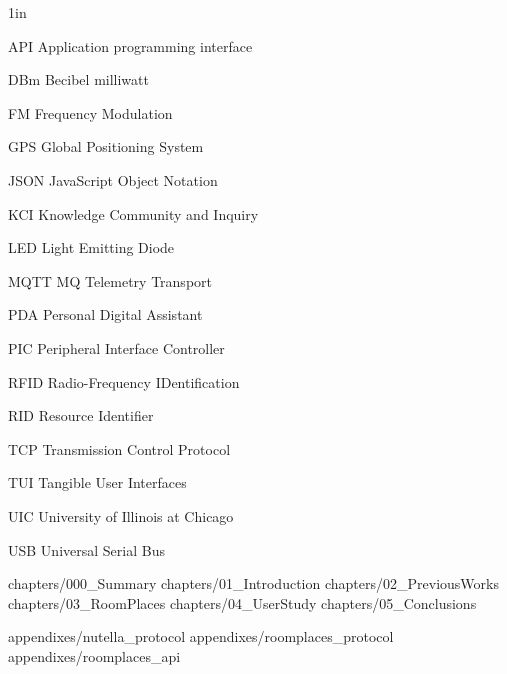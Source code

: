 \documentclass{uicthesi}
\begin{document}
\tableofcontents
\listoftables
\listoffigures
\listofabbreviations
\begin{list}
{}
{\setlength
   {}{1in}
    \setlength{\leftmargin}{1.5in}
    \setlength{\labelsep}{.5in}
    \setlength{\rightmargin}{\leftmargin}}
\item[API\hfill] Application programming interface
\item[DBm\hfill] Becibel milliwatt
\item[FM\hfill] Frequency Modulation
\item[GPS\hfill] Global Positioning System
\item[JSON\hfill] JavaScript Object Notation
\item[KCI\hfill] Knowledge  Community  and  Inquiry
\item[LED\hfill] Light Emitting Diode
\item[MQTT\hfill] MQ Telemetry Transport
\item[PDA\hfill] Personal Digital Assistant
\item[PIC\hfill] Peripheral Interface Controller
\item[RFID\hfill] Radio-Frequency IDentification
\item[RID\hfill] Resource Identifier
\item[TCP\hfill] Transmission Control Protocol
\item[TUI\hfill] Tangible User Interfaces
\item[UIC\hfill] University of Illinois at Chicago
\item[USB\hfill] Universal Serial Bus
\end{list}

\squarebrackets %
\captionsetup[table]{skip=10pt} %

 {chapters/000_Summary}
 {chapters/01_Introduction}
 {chapters/02_PreviousWorks}
 {chapters/03_RoomPlaces}
 {chapters/04_UserStudy}
 {chapters/05_Conclusions}



\appendices
\newpage
\appendix

 {appendixes/nutella_protocol}
 {appendixes/roomplaces_protocol}
 {appendixes/roomplaces_api}

\nocite{*}
\bibformb


\newpage
\vita
\begin{singlespace}
\end{singlespace}
\end{document}
